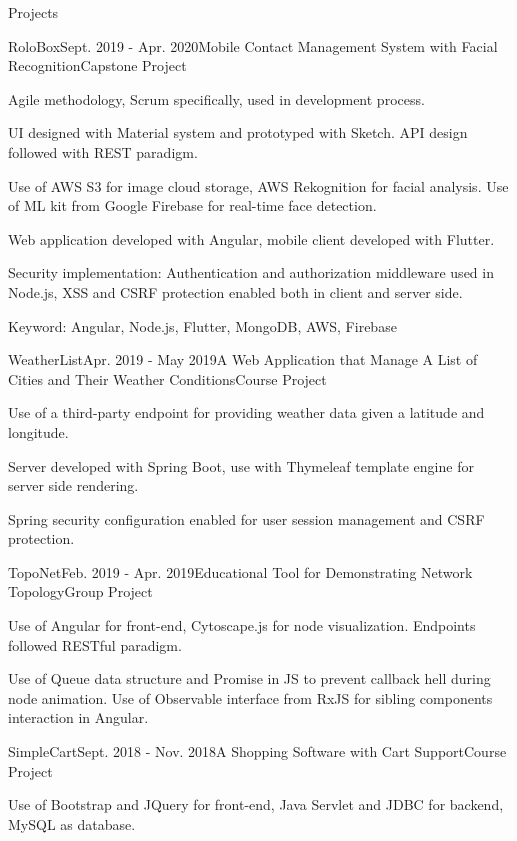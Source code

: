 \documentclass{resume} %
\begin{document}
\begin{rSection}{Projects}

\begin{rSubsection}{RoloBox}{Sept. 2019 - Apr. 2020}{Mobile Contact Management System with Facial Recognition}{Capstone Project}
\item Agile methodology, Scrum specifically, used in development process.
\item UI designed with Material system and prototyped with Sketch. API design followed with REST paradigm.
\item Use of AWS S3 for image cloud storage, AWS Rekognition for facial analysis. Use of ML kit from Google Firebase for real-time face detection.
\item Web application developed with Angular, mobile client developed with Flutter.
\item Security implementation: Authentication and authorization middleware used in Node.js, XSS and CSRF protection enabled both in client and server side.
\item Keyword: Angular, Node.js, Flutter, MongoDB, AWS, Firebase
\end{rSubsection}

\begin{rSubsection}{WeatherList}{Apr. 2019 - May 2019}{A Web Application that Manage A List of Cities and Their Weather Conditions}{Course Project}
\item Use of a third-party endpoint for providing weather data given a latitude and longitude.
\item Server developed with Spring Boot, use with Thymeleaf template engine for server side rendering.
\item Spring security configuration enabled for user session management and CSRF protection.
\end{rSubsection}

\begin{rSubsection}{TopoNet}{Feb. 2019 - Apr. 2019}{Educational Tool for Demonstrating Network Topology}{Group Project}
\item Use of Angular for front-end, Cytoscape.js for node visualization. Endpoints followed RESTful paradigm.
\item Use of Queue data structure and Promise in JS to prevent callback hell during node animation. Use of Observable interface from RxJS for sibling components interaction in Angular.
\end{rSubsection}


\begin{rSubsection}{SimpleCart}{Sept. 2018 - Nov. 2018}{A Shopping Software with Cart Support}{Course Project}
\item Use of Bootstrap and JQuery for front-end, Java Servlet and JDBC for backend, MySQL as database.
\end{rSubsection}

\end{rSection}
\end{document}
